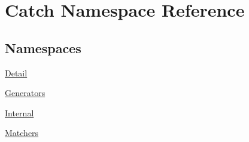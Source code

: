 \hypertarget{namespace_catch}{}\section{Catch Namespace Reference}
\label{namespace_catch}
\subsection*{Namespaces}
\begin{DoxyCompactItemize}
\item 
 \hyperlink{namespace_catch_1_1_detail}{Detail}
\item 
 \hyperlink{namespace_catch_1_1_generators}{Generators}
\item 
 \hyperlink{namespace_catch_1_1_internal}{Internal}
\item 
 \hyperlink{namespace_catch_1_1_matchers}{Matchers}
\end{DoxyCompactItemize}
